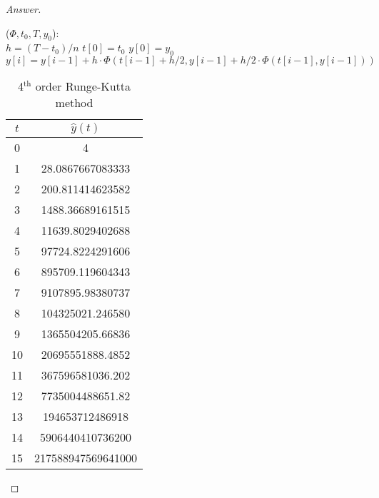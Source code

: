 \begin{proof}[Answer]
\begin{table}[H]
\ifnum{}
	\begin{algorithm2e}[H]
\else
	\begin{algorithm2e}[htbp]
\fi
	\KwFn(\(\Phi,t_0,T,y_0\)){:\\ }
	{
		\(h=(T-t_0)/n\)\;
		\(t[0]=t_0\)\;
		\(y[0]=y_0\)\;
		{
			\(y[i]=y[i-1]+h\cdot\Phi\left(t[i-1]+h/2,y[i-1]+h/2\cdot\Phi(t[i-1],y[i-1])\right)\)\;
		}
	}

	\caption{2\(^\text{nd}\) order Runge-Kutta method}
\end{algorithm2e}



\ifnum{}
	\begin{table}[H]
\else
	\begin{table}[htbp]
\fi
		\centering
		\begin{tabular}[t]{|c|c|}
		\hline
		\(t\)	&	\(\hat{y}(t)\)	\\	\hline
		0	&	4					\\	\hline
		1	&	28.0867667083333	\\	\hline
		2	&	200.811414623582	\\	\hline
		3	&	1488.36689161515	\\	\hline
		4	&	11639.8029402688	\\	\hline
		5	&	97724.8224291606	\\	\hline
		6	&	895709.119604343	\\	\hline
		7	&	9107895.98380737	\\	\hline
		8	&	104325021.246580	\\	\hline
		9	&	1365504205.66836	\\	\hline
		10	&	20695551888.4852	\\	\hline
		11	&	367596581036.202	\\	\hline
		12	&	7735004488651.82	\\	\hline
		13	&	194653712486918		\\	\hline
		14	&	5906440410736200	\\	\hline
		15	&	217588947569641000	\\	\hline
		\end{tabular}
		\caption{4\(^\text{th}\) order Runge-Kutta method}
		\label{rungekutta4}
	\end{table}



\end{table}
\end{algorithm2e}
\end{table}
\end{proof}
